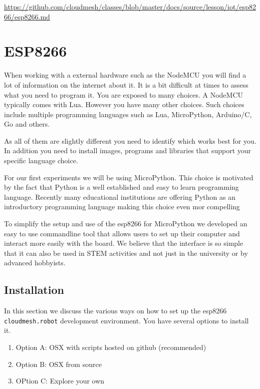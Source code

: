 \begin{fileremark}\url{https://github.com/cloudmesh/classes/blob/master/docs/source/lesson/iot/esp8266/esp8266.md}\end{fileremark}
\section{ESP8266}\label{esp8266}

When working with a external hardware such as the NodeMCU you will find
a lot of information on the internet about it. It is a bit difficult at
times to assess what you need to program it. You are exposed to many
choices. A NodeMCU typically comes with Lua. However you have many other
choices. Such choices include multiple programming languages such as
Lua, MicroPython, Arduino/C, Go and others.

As all of them are slightly different you need to identify which works
best for you. In addition you need to install images, programs and
libraries that support your specific language choice.

For our first experiments we will be using MicroPython. This choice is
motivated by the fact that Python is a well established and easy to
learn programming language. Recently many educational institutions are
offering Python as an introductory programming language making this
choice even mor compelling

To simplify the setup and use of the esp8266 for MicroPython we
developed an easy to use commandline tool that allows users to set up
their computer and interact more easily with the board. We believe that
the interface is so simple that it can also be used in STEM activities
and not just in the university or by advanced hobbyists.

\subsection{Installation}\label{installation}

In this section we discuss the various ways on how to set up the esp8266
\texttt{cloudmesh.robot} development environment. You have several
options to install it.

\begin{enumerate}
\def\labelenumi{\arabic{enumi}.}
\tightlist
\item
  Option A: OSX with scripts hosted on github (recommended)
\item
  Option B: OSX from source
\item
  OPtion C: Explore your own
\end{enumerate}

